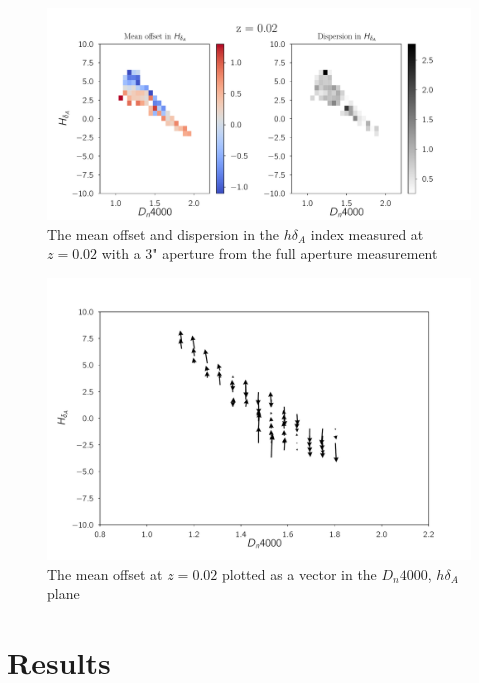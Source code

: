 \begin{figure}
\includegraphics[width=\textwidth]{figures/zc.pdf}
\caption[Short figure name.]{ The mean offset and dispersion in the $h\delta_{A}$ index measured at $z = 0.02$ with a $3$" aperture from the full aperture measurement 
\label{fig:myInlineFigure}}
\end{figure}

\begin{figure}
\includegraphics[width=\textwidth]{figures/zd.pdf}
\caption[Short figure name.]{ The mean offset at $z=0.02$ plotted as a vector in the $D_{n}4000$, $h\delta_{A}$ plane
\label{fig:myInlineFigure}}
\end{figure}

\section{Results}


